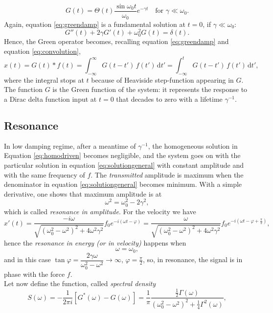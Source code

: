 \documentclass[a4paper,11pt]{article}	%
\theoremstyle{classicthm}
\theoremstyle{definition}
\theoremstyle{definition}
\newcommand{\dd}{\mathrm d}
\renewcommand{\phi}{\varphi}
\begin{document}
\begin{equation}
		G(t)=\Theta( t)\frac{\sin\omega_0t}{\omega_0}e^{-\gamma t}\quad\text{for }\gamma\ll\omega_0.
		\label{eq:greendamp}
\end{equation}
Again, equation \eqref{eq:greendamp} is a fundamental solution at $t=0$, if $\gamma\ll\omega_0$:
\[	G''(t)+2\gamma G'(t)+\omega_0^2G(t)=\delta(t).		\]
Hence, the Green operator becomes, recalling equation \eqref{eq:greendamp} and equation \eqref{eq:convolution},
\[	x(t)=G(t)*f(t)=\int_{-\infty}^{\infty}G(t-t')\,f(t')\,\dd t'=\int_{-\infty}^{t}G(t-t')\,f(t')\,\dd t',		\]
where the integral stops at $t$ because of Heaviside step-function appearing in $G$.\\
The function $G$ is the Green function of the system: it represents the response to a Dirac delta function input at $t=0$ that decades to zero with a lifetime $\gamma^{-1}$.

\subsection{Resonance}

In low damping regime, after a meantime of $\gamma^{-1}$, the homogeneous solution in Equation \eqref{eq:homodriven} becomes negligible, and the system goes on with the particular solution in equation \eqref{eq:solutiongeneral} with constant amplitude and with the same frequency of $f$. The \emph{transmitted} amplitude is maximum when the denominator in equation \eqref{eq:solutiongeneral} becomes minimum. With a simple derivative, one shows that maximum amplitude is at
\[	\omega^2=\omega_0^2-2\gamma^2,	\]
which is called \emph{resonance in amplitude}. For the velocity we have $$x'(t)=\frac{-i\omega}{\sqrt{(\omega_0^2-\omega^2)^2+4\omega^2\gamma^2}}f_0e^{-i(\omega t-\phi)}=\frac{\omega}{\sqrt{(\omega_0^2-\omega^2)^2+4\omega^2\gamma^2}}f_0e^{-i(\omega t-\phi+\frac{\pi}{2})},$$
hence the \emph{resonance in energy (or in velocity)} happens when
\[	\omega=\omega_0,	\]
and in this case $\tan\phi=\dfrac{2\gamma\omega}{\omega_0^2-\omega^2}\to \infty$, $\phi=\frac{\pi}{2}$, so, in resonance, the signal is in phase with the force $f$.\\

\noindent Let now define the function, called \emph{spectral density}
\begin{equation}
	S(\omega)=-\frac{1}{2\pi i}\left[G^*(\omega)-G(\omega)\right]=\frac{1}{\pi}\frac{\frac12\Gamma(\omega)}{(\omega_0^2-\omega^2)^2+\frac14\Gamma^2(\omega)},
\end{equation}
\end{document}
